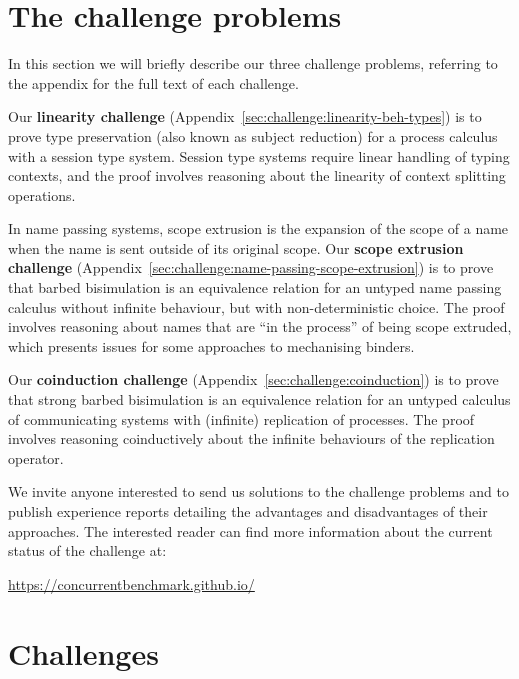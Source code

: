 \documentclass[submission,copyright,creativecommons]{eptcs}
\begin{document}
\section{The challenge problems}
In this section we will briefly describe our three challenge problems, referring to the appendix for the full text of each challenge.

Our \textbf{linearity challenge} (Appendix~\ref{sec:challenge:linearity-beh-types}) is to prove type preservation (also known as subject reduction) for a process calculus with a session type system.
Session type systems require linear handling of typing contexts, and the proof involves reasoning about the linearity of context splitting operations.

In name passing systems, scope extrusion is the expansion of the scope of a name when the name is sent outside of its original scope.
Our \textbf{scope extrusion challenge} (Appendix~\ref{sec:challenge:name-passing-scope-extrusion}) is to prove that barbed bisimulation is an equivalence relation for an untyped name passing calculus without infinite behaviour, but with non-deterministic choice.
The proof involves reasoning about names that are ``in the process'' of being scope extruded, which presents issues for some approaches to mechanising binders.

Our \textbf{coinduction challenge} (Appendix~\ref{sec:challenge:coinduction}) is to prove that strong barbed bisimulation is an equivalence relation for an untyped calculus of communicating systems with (infinite) replication of processes.
The proof involves reasoning coinductively about the infinite behaviours of the replication operator.

We invite anyone interested to send us solutions to the challenge problems and to publish experience reports detailing the advantages and disadvantages of their approaches.
The interested reader can find more information about the current status of the challenge at:
\begin{center}
  \url{https://concurrentbenchmark.github.io/}
\end{center}




\appendix

\section{Challenges}

\end{document}
